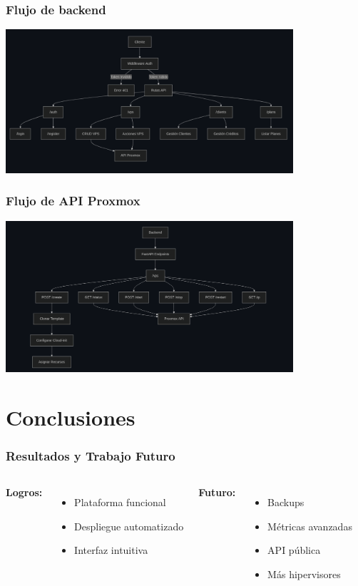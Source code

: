 \documentclass[aspectratio=169]{beamer}
\begin{document}
\begin{frame}
\frametitle{Flujo de backend}
\centering
\includegraphics[width=0.8\textwidth]{img/diagrama_backend.png}
\end{frame}

\begin{frame}
\frametitle{Flujo de API Proxmox}
\centering
\includegraphics[width=0.8\textwidth]{img/diagrama_proxmox.png}
\end{frame}

\section{Conclusiones}

\begin{frame}
\frametitle{Resultados y Trabajo Futuro}
\begin{columns}
\textbf{Logros:}
\begin{itemize}
    \item Plataforma funcional
    \item Despliegue automatizado
    \item Interfaz intuitiva
\end{itemize}
\textbf{Futuro:}
\begin{itemize}
    \item Backups
    \item Métricas avanzadas
    \item API pública
    \item Más hipervisores
\end{itemize}
\end{columns}
\end{frame}
\end{document}

